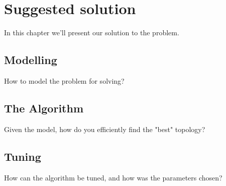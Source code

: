 \chapter{Suggested solution}

In this chapter we'll present our solution to the problem.

\section{Modelling}

How to model the problem for solving?

\section{The Algorithm}

Given the model, how do you efficiently find the "best" topology?

\section{Tuning}

How can the algorithm be tuned, and how was the parameters chosen?

